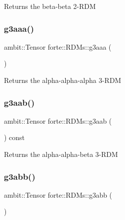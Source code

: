 \begin{DoxyReturn}{Returns}
the beta-\/beta 2-\/\+R\+DM 
\end{DoxyReturn}
\mbox{\label{classforte_1_1_r_d_ms_a7e97b6c90f40a9efe1adc58ca9cfb844}} 
\subsubsection{\texorpdfstring{g3aaa()}{g3aaa()}}
{\footnotesize\ttfamily ambit\+::\+Tensor forte\+::\+R\+D\+Ms\+::g3aaa (\begin{DoxyParamCaption}{ }\end{DoxyParamCaption})}

\begin{DoxyReturn}{Returns}
the alpha-\/alpha-\/alpha 3-\/\+R\+DM 
\end{DoxyReturn}
\mbox{\label{classforte_1_1_r_d_ms_a968c6ae793d2cb19a69d5f6412032557}} 
\subsubsection{\texorpdfstring{g3aab()}{g3aab()}}
{\footnotesize\ttfamily ambit\+::\+Tensor forte\+::\+R\+D\+Ms\+::g3aab (\begin{DoxyParamCaption}{ }\end{DoxyParamCaption}) const\hspace{0.3cm}{\ttfamily [inline]}}

\begin{DoxyReturn}{Returns}
the alpha-\/alpha-\/beta 3-\/\+R\+DM 
\end{DoxyReturn}
\mbox{\label{classforte_1_1_r_d_ms_a022f38931e0a3a359035e01c29e9e948}} 
\subsubsection{\texorpdfstring{g3abb()}{g3abb()}}
{\footnotesize\ttfamily ambit\+::\+Tensor forte\+::\+R\+D\+Ms\+::g3abb (\begin{DoxyParamCaption}{ }\end{DoxyParamCaption})}


